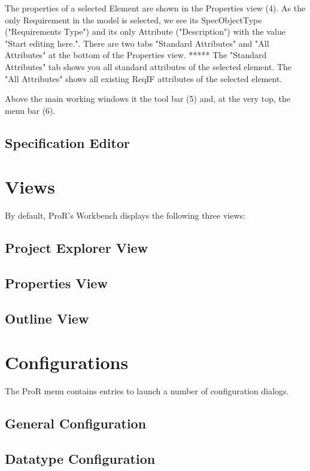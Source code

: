 The properties of a selected Element are shown in the Properties view
(4).  As the only Requirement in the model is selected, we see its
SpecObjectType ("Requirements Type") and its only Attribute
("Description") with the value "Start editing here.".  There are two
tabs "Standard Attributes" and "All Attributes" at the bottom of the
Properties view.  ***** The "Standard Attributes" tab shows you all standard
attributes of the selected element.  The "All Attributes" shows all
existing ReqIF attributes of the selected element.

Above the main working windows it the tool bar (5) and, at the very top, the menu bar (6).
\subsection{Specification Editor}

\section{Views}

By default, ProR's Workbench displays the following three views:

\subsection{Project Explorer View}

\subsection{Properties View}

\subsection{Outline View}

\section{Configurations}


The ProR menu contains entries to launch a number of configuration
dialogs.

\subsection{General Configuration}

\subsection{Datatype Configuration}

